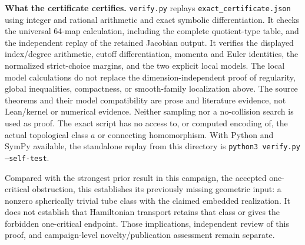 \documentclass[11pt]{article}
\theoremstyle{remark}
\begin{document}
\medskip
\noindent\textbf{What the certificate certifies.}
\texttt{verify.py} replays \texttt{exact\_certificate.json} using
integer and rational arithmetic and exact symbolic differentiation.
It checks the universal 64-map calculation, including the complete
quotient-type table, and the independent replay of the retained
Jacobian output. It verifies the displayed index/degree
arithmetic, cutoff differentiation, momenta and Euler identities,
the normalized strict-choice margins, and the two explicit local
models. The local model calculations do not replace the
dimension-independent proof of regularity, global inequalities,
compactness, or smooth-family localization above.
The source theorems and their model compatibility are prose and
literature evidence, not Lean/kernel or numerical evidence.
Neither sampling nor a no-collision search is used as proof.
The exact script has no access to, or computed encoding of, the
actual topological class \(a\) or connecting homomorphism.
With Python and SymPy available, the standalone replay from this
directory is \texttt{python3 verify.py --self-test}.

Compared with the strongest prior result in this campaign, the
accepted one-critical obstruction, this establishes its previously
missing geometric input: a nonzero spherically trivial tube class
with the claimed embedded realization. It does not establish that
Hamiltonian transport retains that class or gives the forbidden
one-critical endpoint. Those implications, independent review of
this proof, and campaign-level novelty/publication assessment
remain separate.
\end{document}
